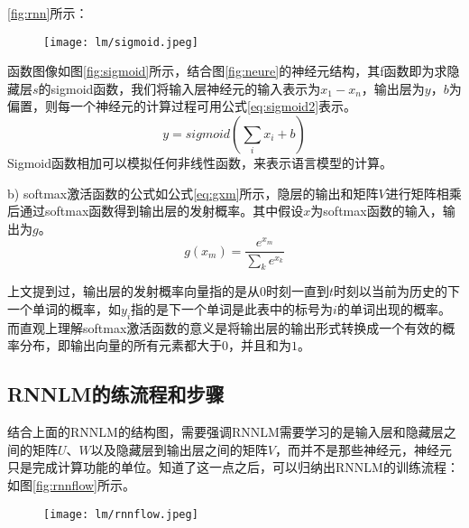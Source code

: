 \ref{fig:rnn}所示：
\begin{figure}[!htbp]
  \centering
  \begin{minipage}[b]{0.6\textwidth}
    \captionstyle{\centering}
    \centering
    \texttt{[image: lm/sigmoid.jpeg]}
  \end{minipage}     
\end{figure}

函数图像如图\ref{fig:sigmoid}所示，结合图\ref{fig:neure}的神经元结构，其f函数即为求隐藏层$s$的sigmoid函数，我们将输入层神经元的输入表示为${x_1}-{x_n}$，输出层为$y$，$b$为偏置，则每一个神经元的计算过程可用公式\ref{eq:sigmoid2}表示。
\begin{equation}
	\label{eq:sigmoid2}
   	y = sigmoid\left( {\sum\limits_i {{x_i} + b} } \right)
\end{equation}
	Sigmoid函数相加可以模拟任何非线性函数，来表示语言模型的计算。
    
    
b)	softmax激活函数的公式如公式\ref{eq:gxm}所示，隐层的输出和矩阵$V$进行矩阵相乘后通过softmax函数得到输出层的发射概率。其中假设$x$为softmax函数的输入，输出为$g$。
\begin{equation}
	\label{eq:gxm}
   	g\left( {{x_m}} \right) = \frac{{{e^{{x_m}}}}}{{\sum\limits_k {{e^{{x_k}}}} }}
\end{equation}

上文提到过，输出层的发射概率向量指的是从$0$时刻一直到$t$时刻以当前为历史的下一个单词的概率，如$y_i$指的是下一个单词是此表中的标号为$i$的单词出现的概率。而直观上理解softmax激活函数的意义是将输出层的输出形式转换成一个有效的概率分布，即输出向量的所有元素都大于$0$，并且和为$1$。


\subsection{RNNLM的练流程和步骤}


结合上面的RNNLM的结构图，需要强调RNNLM需要学习的是输入层和隐藏层之间的矩阵$U$、$W$以及隐藏层到输出层之间的矩阵$V$，而并不是那些神经元，神经元只是完成计算功能的单位。知道了这一点之后，可以归纳出RNNLM的训练流程：如图\ref{fig:rnnflow}所示。

\begin{figure}[!htbp]
  \centering
  \begin{minipage}[b]{0.6\textwidth}
    \captionstyle{\centering}
    \centering
    \texttt{[image: lm/rnnflow.jpeg]}
  \end{minipage}     
\end{figure}


